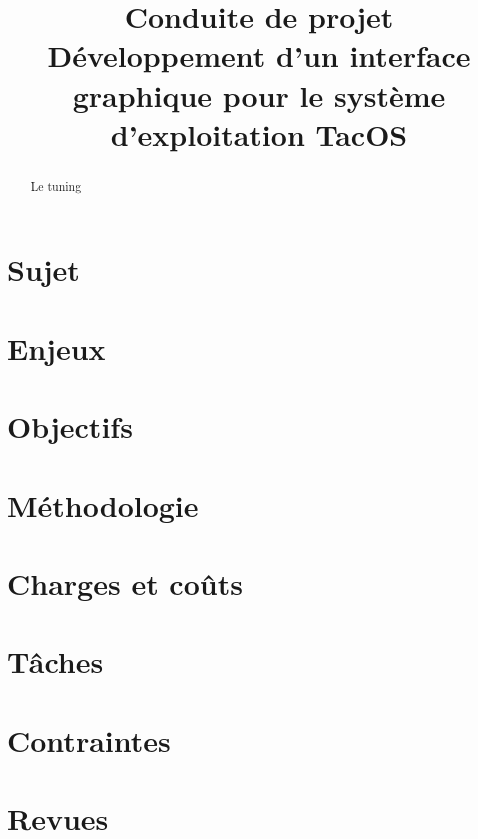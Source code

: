 \documentclass{article}
\title{Conduite de projet \\ Développement d'un interface graphique pour le système d'exploitation TacOS}
\author{}
\begin{document}
\maketitle
\tableofcontents

\begin{abstract}
  Le tuning
\end{abstract}

\section{Sujet}

\section{Enjeux}

\section{Objectifs}

\section{Méthodologie}

\section{Charges et coûts}

\section{Tâches}

\section{Contraintes}

\section{Revues}

\end{document}
